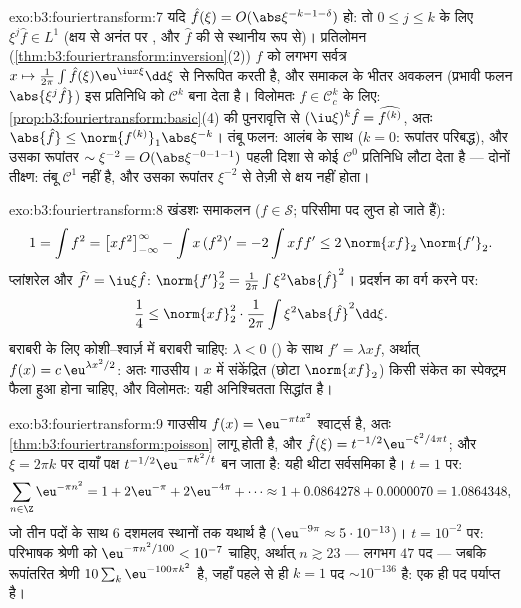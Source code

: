 \begin{solution}{exo:b3:fouriertransform:7}
यदि $\hat f(\xi) = O(\abs\xi^{-k-1-\delta})$ हो: तो $0 \leq j \leq k$ के लिए $\xi^j\hat f
\in L^1$ (क्षय से अनंत पर , और $\hat f$
की  से स्थानीय रूप से)। प्रतिलोमन (\cref{thm:b3:fouriertransform:inversion}(2)) $f$ को लगभग
सर्वत्र $x \mapsto \frac1{2\pi}\int\hat f(\xi)\eu^{\iu
x\xi}\dd\xi$ से निरूपित करती है, और समाकल के भीतर अवकलन (प्रभावी
फलन $\abs{\xi^j\hat f}$) इस प्रतिनिधि को $\mathcal C^k$ बना देता है। विलोमतः $f \in \mathcal C_c^k$ के लिए:
\cref{prop:b3:fouriertransform:basic}(4) की पुनरावृत्ति से $(\iu\xi)^k\hat f = \widehat{f^{(k)}}$, अतः $\abs{\hat f} \leq
\norm{f^{(k)}}_1\abs\xi^{-k}$। तंबू फलन:  आलंब के
साथ  ($k = 0$: रूपांतर परिबद्ध), और उसका रूपांतर $\sim \xi^{-2} = O(\abs\xi^{-0-1-1})$ पहली दिशा
से कोई $\mathcal C^0$ प्रतिनिधि लौटा देता है --- दोनों तीक्ष्ण: तंबू $\mathcal C^1$
नहीं है, और उसका रूपांतर $\xi^{-2}$ से तेज़ी से क्षय नहीं होता।
\end{solution}

\begin{solution}{exo:b3:fouriertransform:8}
खंडशः समाकलन ($f \in \mathcal S$; परिसीमा पद लुप्त हो जाते हैं):
\[
1 = \int f^2 = \bigl[xf^2\bigr]_{-\infty}^{\infty} - \int
x\,(f^2)' = -2\int xff' \leq 2\,\norm{xf}_2\,\norm{f'}_2 .
\]
प्लांशरेल और $\widehat{f'} = \iu\xi\hat f$: $\norm{f'}_2^2 = \frac1{2\pi}\int\xi^2\abs{\hat f}^2$। प्रदर्शन का वर्ग करने पर:
\[
\frac14 \leq \norm{xf}_2^2\cdot\frac1{2\pi}
\int\xi^2\abs{\hat f}^2\dd\xi .
\]
बराबरी के लिए कोशी--श्वार्ज़ में बराबरी चाहिए: $\lambda < 0$ () के
साथ $f' =
\lambda xf$, अर्थात् $f(x) =
c\,\eu^{\lambda x^2/2}$: अतः गाउसीय। $x$ में संकेंद्रित (छोटा
$\norm{xf}_2$) किसी संकेत का स्पेक्ट्रम फैला हुआ होना चाहिए, और विलोमतः:
यही अनिश्चितता सिद्धांत है।
\end{solution}

\begin{solution}{exo:b3:fouriertransform:9}
गाउसीय $f(x) = \eu^{-\pi tx^2}$ श्वार्ट्स है, अतः \cref{thm:b3:fouriertransform:poisson} लागू होती है, और $\hat f(\xi) = t^{-1/2}\eu^{-\xi^2/4\pi t}$; और
$\xi = 2\pi
k$ पर दायाँ पक्ष $t^{-1/2}\eu^{-\pi k^2/t}$ बन जाता है: यही थीटा सर्वसमिका है। $t = 1$
पर:
\[
\sum_{n\in\Z}\eu^{-\pi n^2} = 1 + 2\eu^{-\pi} + 2\eu^{-4\pi} +
\cdots \approx 1 + 0.0864278 + 0.0000070 = 1.0864348,
\]
जो तीन पदों के साथ $6$ दशमलव स्थानों तक यथार्थ है ($\eu^{-9\pi}
\approx 5\cdot10^{-13}$)। $t = 10^{-2}$
पर: परिभाषक श्रेणी को $\eu^{-\pi n^2/100} < 10^{-7}$ चाहिए, अर्थात् $n \gtrsim
23$ --- लगभग $47$ पद
--- जबकि रूपांतरित श्रेणी $10\sum_k\eu^{-100\pi k^2}$ है, जहाँ पहले से ही $k = 1$ पद $\sim 10^{-136}$
है: एक ही पद पर्याप्त है।
\end{solution}


